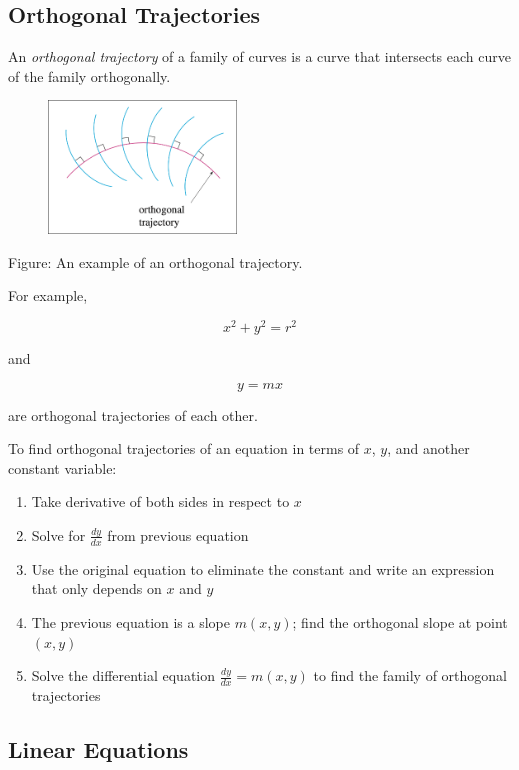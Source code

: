\subsection{Orthogonal Trajectories}

An \textit{orthogonal trajectory} of a family of curves is a curve that intersects each curve of the family orthogonally.

\begin{figure}[H]
    \centering
    \includegraphics[width=50mm]{content/diffeq/images/orthogonal_0.png}
\end{figure}
Figure: An example of an orthogonal trajectory.

For example,

\[
    x^2 + y^2 = r^2
\]

and

\[
    y = mx
\]

are orthogonal trajectories of each other.

To find orthogonal trajectories of an equation in terms of $x$, $y$, and another constant variable:

\begin{enumerate}
    \item Take derivative of both sides in respect to $x$
    \item Solve for $\frac{dy}{dx}$ from previous equation
    \item Use the original equation to eliminate the constant and write an expression that only depends on $x$ and $y$
    \item The previous equation is a slope $m(x,y)$; find the orthogonal slope at point $(x,y)$
    \item Solve the differential equation $\frac{dy}{dx} = m(x,y)$ to find the family of orthogonal trajectories
\end{enumerate}

\subsection{Linear Equations}

